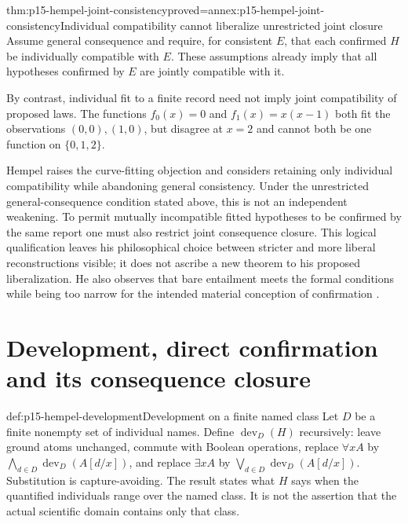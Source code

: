 \begin{hbtheorem}{thm:p15-hempel-joint-consistency}{proved=annex:p15-hempel-joint-consistency}{Individual compatibility cannot liberalize unrestricted joint closure}
Assume general consequence and require, for consistent $E$, that each
confirmed $H$ be individually compatible with $E$. These assumptions
already imply that all hypotheses confirmed by $E$ are jointly compatible
with it.

By contrast, individual fit to a finite record need not imply joint
compatibility of proposed laws. The functions $f_0(x)=0$ and
$f_1(x)=x(x-1)$ both fit the observations $(0,0),(1,0)$, but disagree at
$x=2$ and cannot both be one function on $\{0,1,2\}$.
\end{hbtheorem}

Hempel raises the curve-fitting objection and considers retaining only
individual compatibility while abandoning general consistency. Under the
unrestricted general-consequence condition stated above, this is not an
independent weakening. To permit mutually incompatible fitted hypotheses
to be confirmed by the same report one must also restrict joint consequence
closure. This logical qualification leaves his philosophical choice between
stricter and more liberal reconstructions visible; it does not ascribe a
new theorem to his proposed liberalization. He also observes that bare
entailment meets the formal conditions while being too narrow for the
intended material conception of confirmation
\parencite[II, pp.~105--107]{Hempel1945ConfirmationII}.

\section{Development, direct confirmation and its consequence closure}
\label{sec:p15-hempel-satisfaction}

\begin{hbdefinition}{def:p15-hempel-development}{Development on a finite named class}
Let $D$ be a finite nonempty set of individual names. Define
$\operatorname{dev}_D(H)$ recursively: leave ground atoms unchanged,
commute with Boolean operations, replace $\forall xA$ by
$\bigwedge_{d\in D}\operatorname{dev}_D(A[d/x])$, and replace $\exists xA$
by $\bigvee_{d\in D}\operatorname{dev}_D(A[d/x])$. Substitution is
capture-avoiding. The result states what $H$ says when the quantified
individuals range over the named class. It is not the assertion that the
actual scientific domain contains only that class.
\end{hbdefinition}

